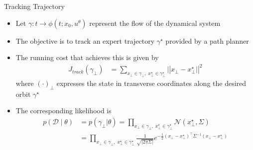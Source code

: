 \begin{frame}{Tracking Trajectory}
    \begin{itemize}
        \item Let $\gamma : t \rightarrow \phi(t;x_0, u^\theta)$ represent the flow of the dynamical system
        \item The objective is to track an expert trajectory $\gamma^\star$ provided by a path planner 
        \item The running cost that achieves this is given by 
        \begin{align*}
            J_{track}(\gamma_\bot) &= \sum_{x_\bot \in \gamma_\bot, \; x^\star_\bot \in \gamma^\star_\bot} |\left| x_\bot-x^\star_\bot | \right |^2  
        \end{align*}
        where $(\cdot)_\bot$ expresses the state in transverse coordinates along the desired orbit $\gamma^\star$
        \item The corresponding likelihood is 
        \begin{align*}
            p(\mathcal{D} \mid \theta) &= p(\gamma_\bot | \theta) = \prod_{x_\bot \in \gamma_\bot, \; x^\star_\bot \in \gamma^\star_\bot}\mathcal{N}(x^\star_\bot , \Sigma) \\
            &= \prod_{x_\bot \in \gamma_\bot, \; x^\star_\bot \in \gamma^\star_\bot} \frac{1}{\sqrt{|2\pi \Sigma|}} e^{-\frac{1}{2}(x_\bot - x^\star_\bot)^\top \Sigma^{-1} (x_\bot - x^\star_\bot)}
        \end{align*}
    \end{itemize}
\end{frame}


